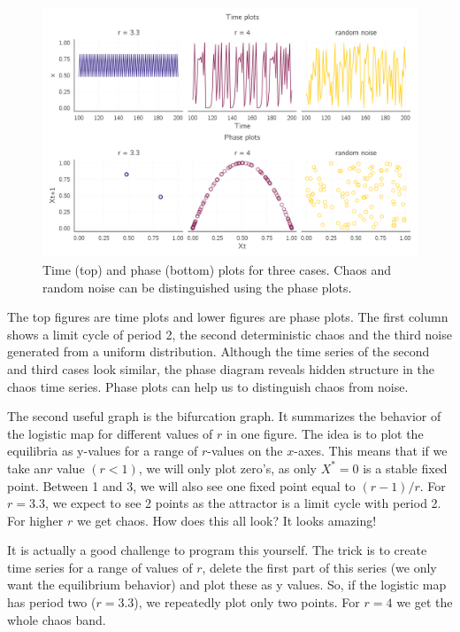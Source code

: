 \documentclass[
  a4paper,
  DIV=11,
  numbers=noendperiod]{scrreprt}
\begin{document}
\begin{figure}

{\centering \includegraphics{media/ch2/fig-ch2-img7.jpg}

}

\caption{\label{fig-ch2-img7}Time (top) and phase (bottom) plots for
three cases. Chaos and random noise can be distinguished using the phase
plots.}

\end{figure}

The top figures are time plots and lower figures are phase plots. The
first column shows a limit cycle of period 2, the second deterministic
chaos and the third noise generated from a uniform distribution.
Although the time series of the second and third cases look similar, the
phase diagram reveals hidden structure in the chaos time series. Phase
plots can help us to distinguish chaos from noise.

The second useful graph is the bifurcation graph. It summarizes the
behavior of the logistic map for different values of \(r\) in one
figure. The idea is to plot the equilibria as y-values for a range of
\(r\)-values on the \(x\)-axes. This means that if we take an\(r\) value
\((r < 1)\), we will only plot zero's, as only \(X^{*} = 0\) is a stable
fixed point. Between 1 and 3, we will also see one fixed point equal to
\((r - 1)/r\). For \(r = 3.3\), we expect to see 2 points as the
attractor is a limit cycle with period 2. For higher \(r\) we get chaos.
How does this all look? It looks amazing!

It is actually a good challenge to program this yourself. The trick is
to create time series for a range of values of \(r\), delete the first
part of this series (we only want the equilibrium behavior) and plot
these as y values. So, if the logistic map has period two (\(r = 3.3\)),
we repeatedly plot only two points. For \(r = 4\) we get the whole chaos
band.
\end{document}
